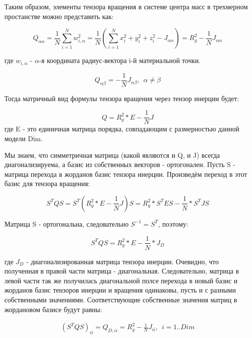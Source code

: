Таким образом, элементы тензора вращения в системе центра масс в трехмерном простанстве можно представить как:

\begin{equation}
   Q_{\alpha\alpha} = \frac{1}{N}\sum^{N}_{i=1}w_{i,\alpha}^2 = \frac{1}{N} \left(\sum_{i=1}^{N}x_{i}^{2} + y_{i}^{2} + z_{i}^{2} - J_{\alpha\alpha}\right) = R^{2}_{g} - \frac{1}{N} J_{\alpha\alpha}  
\end{equation}

где $w_{i,\alpha}$ - $\alpha$-я координата радиус-вектора i-й материальной точки.

\begin{equation}
    Q_{\alpha\beta} = -\frac{1}{N} J_{\alpha\beta},\ \ \alpha \neq \beta
\end{equation}

Тогда матричный вид формулы тензора вращения через тензор инерции будет:

\begin{equation}
    Q = R_{g}^{2} * E - \frac{1}{N} J
\end{equation}
где E - это единичная матрица порядка, совпадающим с размерностью данной модели Dim.

Мы знаем, что симметричная матрица (какой являются и Q, и J) всегда диагонализируема, а базис из собственных векторов - ортогонален. Пусть S - матрица перехода в жорданов базис тензора инерции. Произведём переход в этот базис для тензора вращения:

\begin{equation*}
    S^{T}QS = S^{T} (R_{g}^{2} * E - \frac{1}{N} J) S = R^{2}_{g} * S^{T}ES-\frac{1}{N} * S^{T}JS
\end{equation*}

Матрица S - ортогональна, следовательно $S^{-1} = S^{T}$, поэтому:

\begin{equation}
    S^{T}QS = R^{2}_{g} * E - \frac{1}{N} * J_{D}
\end{equation}

где $J_{D}$ - диагонализированная матрица тензора инерции. Очевидно, что полученная в правой части матрица - диагональная. Следовательно, матрица в левой части так же получилась диагональной полсе перехода в новый базис и жорданов базис тензоров инерции и вращения одинаковы, пусть и с разными собственными значениями. Соответствующие собственные значения матриц в жордановом базисе будут равны:

\begin{align*}
    (S^{T}QS)_{ii} = Q_{D, ii} = R^{2}_{g} - \frac{1}{N}J_{ii},\ \ i=1..Dim
\end{align*}


